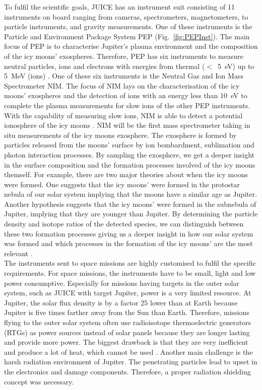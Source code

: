 	To fulfil the scientific goals, JUICE has an instrument suit consisting of 11 instruments on board ranging from cameras, spectrometers, magnetometers, to particle instruments, and gravity measurements. One of these instruments is the Particle and Environment Package System PEP (Fig.~\ref{fig:PEPInst}). The main focus of PEP is to characterise Jupiter's plasma environment and the composition of the icy moons' exospheres. Therefore, PEP has six instruments to measure neutral particles, ions and electrons with energies from thermal ($<$~5~eV) up to 5~MeV (ions) \cite{PEP_inst}. One of these six instruments is the Neutral Gas and Ion Mass Spectrometer NIM. The focus of NIM lays on the characterisation of the icy moons' exospheres and the detection of ions with an energy less than 10~eV to complete the plasma measurements for slow ions of the other PEP instruments. With the capability of measuring slow ions, NIM is able to detect a potential ionosphere of the icy moons \cite{Diss_Meyer}. NIM will be the first mass spectrometer taking in situ measurements of the icy moons exosphere. The exosphere is formed by particles released from the moons' surface by ion bombardment, sublimation and photon interaction processes. By sampling the exosphere, we get a deeper insight in the surface composition and the formation processes involved of the icy moons themself. For example, there are two major theories about when the icy moons were formed. One suggests that the icy moons' were formed in the protostar nebula of our solar system implying that the moons have a similar age as Jupiter. Another hypothesis suggests that the icy moons' were formed in the subnebula of Jupiter, implying that they are younger than Jupiter. By determining the particle density and isotope ratios of the detected species, we can distinguish between these two formation processes giving us a deeper insight in how our solar system was formed and which processes in the formation of the icy moons' are the most relevant \cite[and references therein]{Vorburger2015}.\\
	
	The instruments sent to space missions are highly customised to fulfil the specific requirements. For space missions, the instruments have to be small, light and low power consumptive. Especially for missions having targets in the outer solar system, such as JUICE with target Jupiter, power is a very limited resource. At Jupiter, the solar flux density is by a factor 25 lower than at Earth because Jupiter is five times farther away from the Sun than Earth. Therefore, missions flying to the outer solar system often use radioisotope thermoelectric generators (RTGs) as power sources instead of solar panels because they are longer lasting and provide more power. The biggest drawback is that they are very inefficient and produce a lot of heat, which cannot be used \cite{Power_Space}. Another main challenge is the harsh radiation environment of Jupiter. The penetrating particles lead to upset in the electronics and damage components. Therefore, a proper radiation shielding concept was necessary.\\

